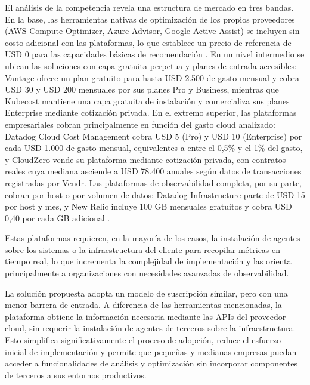 El análisis de la competencia revela una estructura de mercado en tres bandas. En la base, las herramientas nativas de optimización de los propios proveedores (AWS Compute Optimizer, Azure Advisor, Google Active Assist) se incluyen sin costo adicional con las plataformas, lo que establece un precio de referencia de USD 0 para las capacidades básicas de recomendación \parencite{AWSComputeOptimizer2026, AzureAdvisor2026}. En un nivel intermedio se ubican las soluciones con capa gratuita perpetua y planes de entrada accesibles: Vantage ofrece un plan gratuito para hasta USD 2.500 de gasto mensual y cobra USD 30 y USD 200 mensuales por sus planes Pro y Business, mientras que Kubecost mantiene una capa gratuita de instalación y comercializa sus planes Enterprise mediante cotización privada. En el extremo superior, las plataformas empresariales cobran principalmente en función del gasto cloud analizado: Datadog Cloud Cost Management cobra USD 5 (Pro) y USD 10 (Enterprise) por cada USD 1.000 de gasto mensual, equivalentes a entre el 0,5\% y el 1\% del gasto, y CloudZero vende su plataforma mediante cotización privada, con contratos reales cuya mediana asciende a USD 78.400 anuales según datos de transacciones registradas por Vendr. Las plataformas de observabilidad completa, por su parte, cobran por host o por volumen de datos: Datadog Infrastructure parte de USD 15 por host y mes, y New Relic incluye 100 GB mensuales gratuitos y cobra USD 0,40 por cada GB adicional \parencite{Vantage2026, DatadogPricing2026, Kubecost2026, VendrCloudZero2026, NewRelic2026}.

Estas plataformas requieren, en la mayoría de los casos, la instalación de agentes sobre los sistemas o la infraestructura del cliente para recopilar métricas en tiempo real, lo que incrementa la complejidad de implementación y las orienta principalmente a organizaciones con necesidades avanzadas de observabilidad.

La solución propuesta adopta un modelo de suscripción similar, pero con una menor barrera de entrada. A diferencia de las herramientas mencionadas, la plataforma obtiene la información necesaria mediante las APIs del proveedor cloud, sin requerir la instalación de agentes de terceros sobre la infraestructura. Esto simplifica significativamente el proceso de adopción, reduce el esfuerzo inicial de implementación y permite que pequeñas y medianas empresas puedan acceder a funcionalidades de análisis y optimización sin incorporar componentes de terceros a sus entornos productivos.

